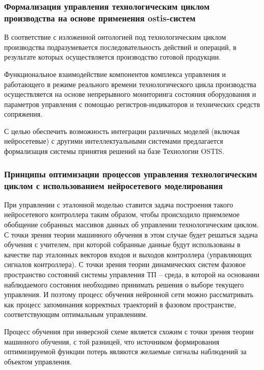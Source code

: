 \subsubsection{Формализация управления технологическим циклом производства на основе применения ostis-систем}
\label{sec_chapter_enterprise_control_formalization}


В соответствие с изложенной онтологией под технологическим циклом производства подразумевается последовательность действий и операций, в результате которых осуществляется производство готовой продукции.

Функциональное взаимодействие компонентов комплекса управления и работающего в режиме реального времени технологического цикла производства осуществляется на основе непрерывного мониторинга состояния оборудования и параметров управления с помощью регистров-индикаторов и технических средств сопряжения.


С целью обеспечить возможность интеграции различных моделей (включая нейросетевые) с другими интеллектуальными системами предлагается формализация системы принятия решений на базе Технологии OSTIS.





\subsubsection{Принципы оптимизации процессов управления технологическим циклом с использованием нейросетевого моделирования}
\label{sec_chapter_enterprise_control_optimization_neural}

При управлении с эталонной моделью ставится задача построения такого нейросетевого контроллера таким образом, чтобы происходило приемлемое обобщение собранных массивов данных об управлении технологическим циклом. С точки зрения теории машинного обучения в этом случае будет решаться задача обучения с учителем, при которой собранные данные будут использованы в качестве пар эталонных векторов входов и выходов контроллера (управляющих сигналов контроллера). С точки зрения теории динамических систем фазовое пространство состояний системы управления ТП – среда, в которой на основании наблюдаемого состояния необходимо принимать решения о выборе текущего управления. И поэтому процесс обучения нейронной сети можно рассматривать как процесс запоминания корректных траекторий в фазовом пространстве, соответствующим оптимальным управлениям.

Процесс обучения при инверсной схеме является схожим с точки зрения теории машинного обучения, с той разницей, что источником формирования оптимизируемой функции потерь являются желаемые сигналы наблюдений за объектом управления.

